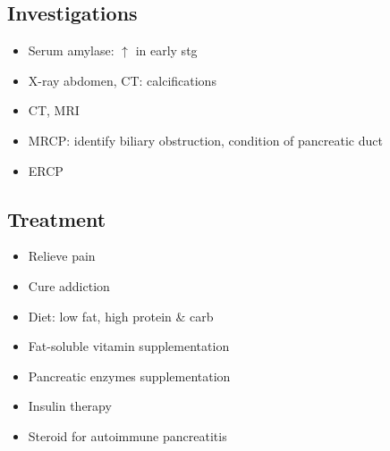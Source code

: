 \documentclass[
  14pt,
]{memoir}
\providecommand{\tightlist}{%
  \setlength{\itemsep}{0pt}\setlength{\parskip}{0pt}}
\begin{document}
\hypertarget{investigations-10}{%
\subsection{Investigations}\label{investigations-10}}

\begin{itemize}
\tightlist
\item
  Serum amylase: \(\uparrow\) in early stg
\item
  X-ray abdomen, CT: calcifications
\item
  CT, MRI
\item
  MRCP: identify biliary obstruction, condition of pancreatic duct
\item
  ERCP
\end{itemize}

\hypertarget{treatment-10}{%
\subsection{Treatment}\label{treatment-10}}

\begin{itemize}
\tightlist
\item
  Relieve pain
\item
  Cure addiction
\item
  Diet: low fat, high protein \& carb
\item
  Fat-soluble vitamin supplementation
\item
  Pancreatic enzymes supplementation
\item
  Insulin therapy
\item
  Steroid for autoimmune pancreatitis
\end{itemize}

\backmatter
\end{document}
